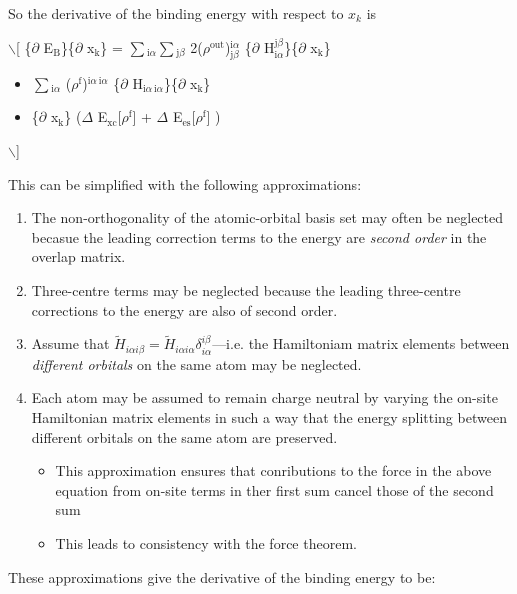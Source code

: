 \documentclass[11pt]{article}
\begin{document}
\begin{enumerate}
\begin{enumerate}
So the derivative of the binding energy with respect to $x_k$ is 

$\backslash$[
\frac\{$\partial$ E$_{\text{B}}$\}\{$\partial$ x$_{\text{k}}$\} = 
   $\sum$$_{\text{i}\alpha}$$\sum$$_{\text{j}\beta}$ 2($\rho$$^{\text{out}}$)$^{\text{i}\alpha}_{\text{j}\beta}$
       \frac\{$\partial$ H$^{\text{j}\beta}_{\text{i}\alpha}$\}\{$\partial$ x$_{\text{k}}$\}
\begin{itemize}
\item $\sum$$_{\text{i}\alpha}$ ($\rho$$^{\text{f}}$)$^{\text{i}\alpha\ \text{i}\alpha}$ 
                  \frac\{$\partial$ H$_{\text{i}\alpha\ \text{i}\alpha}$\}\{$\partial$ x$_{\text{k}}$\}
\item \frac{\partial}\{$\partial$ x$_{\text{k}}$\} \big($\Delta$ E$_{\text{xc}}$[$\rho$$^{\text{f}}$] + $\Delta$ E$_{\text{es}}$[$\rho$$^{\text{f}}$] \big )
\end{itemize}
$\backslash$]


This can be simplified with the following approximations:

\begin{enumerate}
\item The non-orthogonality of the atomic-orbital basis set may often be
neglected becasue the leading correction terms to the energy are \emph{second
order} in the overlap matrix.
\item Three-centre terms may be neglected because the leading three-centre
corrections to the energy are also of second order.
\item Assume that $\widetilde{H}_{i\alpha i\beta} = \widetilde{H}_{i\alpha i\alpha}
   \delta^{i\beta}_{i\alpha}$---i.e. the Hamiltoniam matrix elements between
\emph{different orbitals} on the same atom may be neglected.
\item Each atom may be assumed to remain charge neutral by varying the on-site
Hamiltonian matrix elements in such a way that the energy splitting
between different orbitals on the same atom are preserved.
\begin{itemize}
\item This approximation ensures that conributions to the force in the above
equation from on-site terms in ther first sum cancel those of the second sum
\item This leads to consistency with the force theorem.
\end{itemize}
\end{enumerate}

These approximations give the derivative of the binding energy to be:


\end{enumerate}
\end{enumerate}
\end{document}

